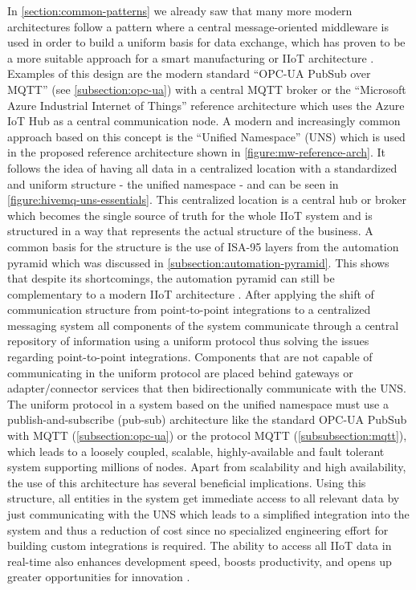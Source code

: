    \noindent In \autoref{section:common-patterns} we already saw that many more modern architectures follow a pattern where a central message-oriented middleware is used in order to build a uniform basis for data exchange, which has proven to be a more suitable approach for a smart manufacturing or IIoT architecture \cite{smart_manufacturing_using_isa95_mqtt}. Examples of this design are the modern standard ``OPC-UA PubSub over MQTT'' (see \autoref{subsection:opc-ua}) with a central MQTT broker or the ``Microsoft Azure Industrial Internet of Things'' reference architecture which uses the Azure IoT Hub as a central communication node. A modern and increasingly common approach based on this concept is the ``Unified Namespace'' (UNS) which is used in the proposed reference architecture shown in \autoref{figure:mw-reference-arch}. It follows the idea of having all data in a centralized location with a standardized and uniform structure - the unified namespace - and can be seen in \autoref{figure:hivemq-uns-essentials}. This centralized location is a central hub or broker which becomes the single source of truth for the whole IIoT system and is structured in a way that represents the actual structure of the business. A common basis for the structure is the use of ISA-95 layers from the automation pyramid which was discussed in \autoref{subsection:automation-pyramid}. This shows that despite its shortcomings, the automation pyramid can still be complementary to a modern IIoT architecture \cite{smart_manufacturing_using_isa95_mqtt}. After applying the shift of communication structure from point-to-point integrations to a centralized messaging system all components of the system communicate through a central repository of information using a uniform protocol thus solving the issues regarding point-to-point integrations. Components that are not capable of communicating in the uniform protocol are placed behind gateways or adapter/connector services that then bidirectionally communicate with the UNS. The uniform protocol in a system based on the unified namespace must use a publish-and-subscribe (pub-sub) architecture like the standard OPC-UA PubSub with MQTT (\autoref{subsection:opc-ua}) or the protocol MQTT (\autoref{subsubsection:mqtt}), which leads to a loosely coupled, scalable, highly-available and fault tolerant system supporting millions of nodes. Apart from scalability and high availability, the use of this architecture has several beneficial implications. Using this structure, all entities in the system get immediate access to all relevant data by just communicating with the UNS which leads to a simplified integration into the system and thus a reduction of cost since no specialized engineering effort for building custom integrations is required. The ability to access all IIoT data in real-time also enhances development speed, boosts productivity, and opens up greater opportunities for innovation \cite{building_iiot, hivemq_essentials_uns}. \newline

